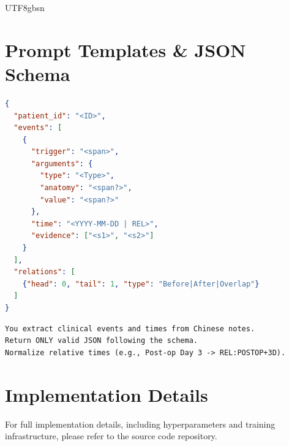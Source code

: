 \documentclass[11pt]{article}
\begin{document}
\begin{CJK*}{UTF8}{gbsn}
\section{Prompt Templates \& JSON Schema}
\label{app:prompts}

\begin{lstlisting}[language=json, caption={Structured event--time JSON schema.}, label={lst:json-schema}]
{
  "patient_id": "<ID>",
  "events": [
    {
      "trigger": "<span>",
      "arguments": {
        "type": "<Type>",
        "anatomy": "<span?>",
        "value": "<span?>"
      },
      "time": "<YYYY-MM-DD | REL>",
      "evidence": ["<s1>", "<s2>"]
    }
  ],
  "relations": [
    {"head": 0, "tail": 1, "type": "Before|After|Overlap"}
  ]
}
\end{lstlisting}

\begin{lstlisting}[style=prompt, caption={GPT-4 prompt excerpt (English, CN-aware).}, label={lst:llm-baseline-prompt}]
You extract clinical events and times from Chinese notes.
Return ONLY valid JSON following the schema.
Normalize relative times (e.g., Post-op Day 3 -> REL:POSTOP+3D).
\end{lstlisting}

\section{Implementation Details}
\label{app:impl}
For full implementation details, including hyperparameters and training infrastructure, please refer to the source code repository.

\end{CJK*}
\end{document}
